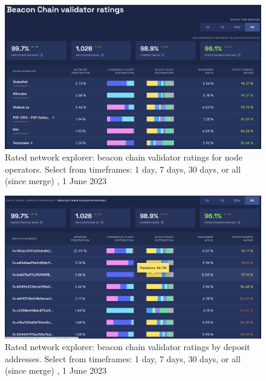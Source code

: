 \documentclass[UTF8]{article}
\begin{document}
{\begin{figure}[htbp]
\begin{center}
\includegraphics[width=\linewidth]{images/ratedentity2}
\caption{Rated network explorer: beacon chain validator ratings for node operators. Select from timeframes: 1 day, 7 days, 30 days, or all (since merge) , 1 June 2023}
\label{fig:ratedentity2}
\end{center}
\end{figure}

\begin{figure}[htbp]
\begin{center}
\includegraphics[width=\linewidth]{images/ratedentity3}
\caption{Rated network explorer: beacon chain validator ratings by deposit addresses. Select from timeframes: 1 day, 7 days, 30 days, or all (since merge) , 1 June 2023}
\label{fig:ratedentity3}
\end{center}
\end{figure}

}
\end{document}
